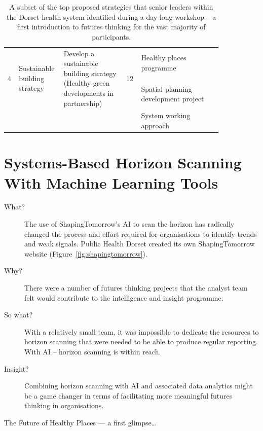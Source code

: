 \begin{table}[h]
\begin{center}
\begin{tabularx}{\linewidth}{p{0.04\linewidth} p{0.135\linewidth} p{0.275\linewidth} p{0.045\linewidth} p{0.35\linewidth}}
			\multirow{2}{*}{4} & \multirow{2}{\hsize}{Sustainable building strategy} & \multirow{2}{\hsize}{Develop a sustainable building strategy (Healthy green developments in partnership)} & \multirow{2}{*}{12} & Healthy places programme\vspace{0.5\baselineskip} \\			
			& & & & Spatial planning development project\vspace{0.5\baselineskip} \\
			& & & & System working approach\vspace{0.5\baselineskip} \\

			\bottomrule
		\end{tabularx}
	\end{center}
	\caption{A subset of the top proposed strategies that senior leaders within the Dorset health system identified during a day-long workshop – a first introduction to futures thinking for the vast majority of participants.}
	\label{tab:contrasting}
\end{table}

\section{Systems-Based Horizon Scanning With Machine Learning Tools}

\begin{description}
	\item[What?] The use of ShapingTomorrow’s AI to scan the horizon has radically changed the process and effort required for organisations to identify trends and weak signals. Public Health Dorset created its own ShapingTomorrow website (Figure~\ref{fig:shapingtomorrow}).
	\item[Why?] There were a number of futures thinking projects that the analyst team felt would contribute to the intelligence and insight programme.
	\item[So what?] With a relatively small team, it was impossible to dedicate the resources to horizon scanning that were needed to be able to produce regular reporting. With AI – horizon scanning is within reach.
	\item[Insight?] Combining horizon scanning with AI and associated data analytics might be a game changer in terms of facilitating more meaningful futures thinking in organisations.
\end{description}

The Future of Healthy Places — a first glimpse…


